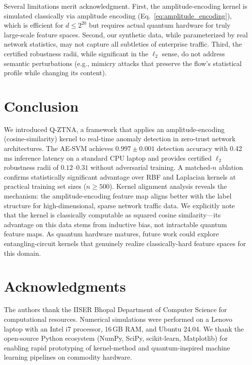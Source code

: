 \documentclass[twocolumn,a4paper,11pt]{article}
\begin{document}
Several limitations merit acknowledgment. First, the amplitude-encoding kernel is simulated
classically via amplitude encoding (Eq.~\ref{eq:amplitude_encoding}), which is
efficient for $d \leq 2^{20}$ but requires actual quantum hardware for truly
large-scale feature spaces. Second, our synthetic data, while parameterized by
real network statistics, may not capture all subtleties of enterprise traffic.
Third, the certified robustness radii, while significant in the $\ell_2$ sense,
do not address semantic perturbations (e.g., mimicry attacks that preserve the
flow's statistical profile while changing its content).

\FloatBarrier
\vspace{-1ex}
\section{Conclusion}
\label{sec:conclusion}

We introduced Q-ZTNA, a framework that applies an amplitude-encoding (cosine-similarity)
kernel to real-time anomaly detection in zero-trust network architectures. The AE-SVM
achieves $0.997 \pm 0.001$ detection accuracy with 0.42\,ms inference latency on a
standard CPU laptop and provides certified $\ell_2$ robustness radii of $0.12$--$0.31$
without adversarial training. A matched-$n$ ablation confirms statistically
significant advantage over RBF and Laplacian kernels at practical training set
sizes ($n \geq 500$). Kernel alignment analysis reveals the mechanism: the
amplitude-encoding feature map aligns better with the label structure for
high-dimensional, sparse network traffic data. We explicitly note that the kernel
is classically computable as squared cosine similarity---its advantage on this
data stems from inductive bias, not intractable quantum feature maps. As quantum
hardware matures, future work could explore entangling-circuit kernels that
genuinely realize classically-hard feature spaces for this domain.

\section*{Acknowledgments}

The authors thank the IISER Bhopal Department of Computer Science for computational
resources. Numerical simulations were performed on a Lenovo laptop with an Intel i7
processor, 16\,GB RAM, and Ubuntu 24.04. We thank the open-source Python ecosystem
(NumPy, SciPy, scikit-learn, Matplotlib) for enabling rapid prototyping of
kernel-method and quantum-inspired machine learning pipelines on commodity hardware.
\end{document}
